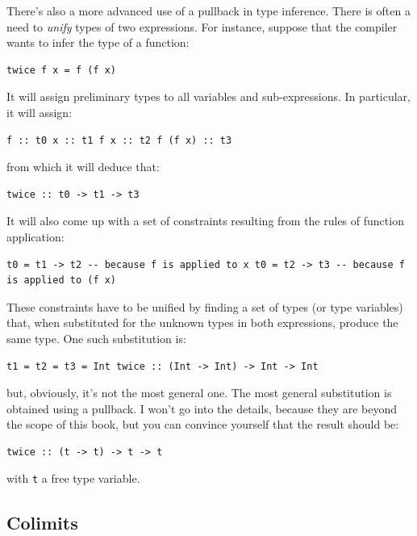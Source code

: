 There's also a more advanced use of a pullback in type inference. There
is often a need to \emph{unify} types of two expressions. For instance,
suppose that the compiler wants to infer the type of a function:

\begin{verbatim}
twice f x = f (f x)
\end{verbatim}

It will assign preliminary types to all variables and sub-expressions.
In particular, it will assign:

\begin{verbatim}
f :: t0 x :: t1 f x :: t2 f (f x) :: t3
\end{verbatim}

from which it will deduce that:

\begin{verbatim}
twice :: t0 -> t1 -> t3
\end{verbatim}

It will also come up with a set of constraints resulting from the rules
of function application:

\begin{verbatim}
t0 = t1 -> t2 -- because f is applied to x t0 = t2 -> t3 -- because f is applied to (f x)
\end{verbatim}

These constraints have to be unified by finding a set of types (or type
variables) that, when substituted for the unknown types in both
expressions, produce the same type. One such substitution is:

\begin{verbatim}
t1 = t2 = t3 = Int twice :: (Int -> Int) -> Int -> Int
\end{verbatim}

but, obviously, it's not the most general one. The most general
substitution is obtained using a pullback. I won't go into the details,
because they are beyond the scope of this book, but you can convince
yourself that the result should be:

\begin{verbatim}
twice :: (t -> t) -> t -> t
\end{verbatim}

with \texttt{t} a free type variable.

\subsection{Colimits}\label{colimits}

